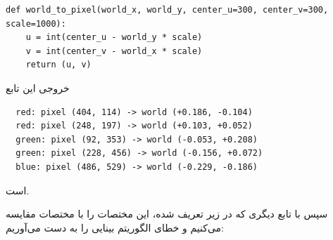\documentclass{article}
\begin{document}
\begin{latin}
\begin{LTR}
\begin{listing}[htbp]
\begin{verbatim}
def world_to_pixel(world_x, world_y, center_u=300, center_v=300, scale=1000):
    u = int(center_u - world_y * scale)
    v = int(center_v - world_x * scale)
    return (u, v)
\end{verbatim}
\end{listing}
\end{LTR}
\end{latin}



خروجی این تابع 

\begin{latin}
\begin{LTR}
\begin{verbatim}
  red: pixel (404, 114) -> world (+0.186, -0.104)
  red: pixel (248, 197) -> world (+0.103, +0.052)
  green: pixel (92, 353) -> world (-0.053, +0.208)
  green: pixel (228, 456) -> world (-0.156, +0.072)
  blue: pixel (486, 529) -> world (-0.229, -0.186)
\end{verbatim}
\end{LTR}
\end{latin}
است.

سپس با تابع دیگری که در زیر تعریف شده، این مختصات را با مختصات  مقایسه می‌کنیم و خطای الگوریتم بینایی را به دست می‌آوریم:
\end{document}
